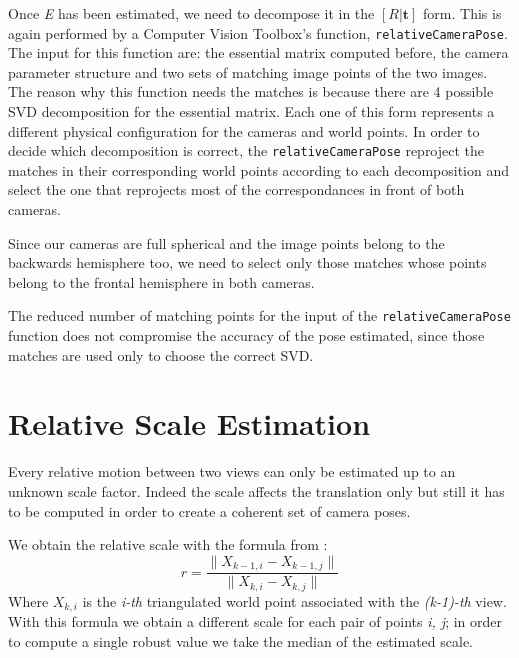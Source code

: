 Once \textit{E} has been estimated, we need to decompose it in the 
\( [R|\mathbf{t} ] \) form. This is again performed by a Computer Vision 
Toolbox's function, {\tt relativeCameraPose}.
The input for this function are: the essential matrix computed before, the 
camera parameter structure and two sets of matching image points of the two 
images.
The reason why this function needs the matches is because there are 4 possible 
SVD decomposition for the essential matrix. Each one of this form represents a 
different physical configuration for the cameras and world points.
In order to decide which decomposition is correct, the {\tt relativeCameraPose}
reproject the matches in their corresponding world points according to each 
decomposition and select the one that reprojects most of the correspondances in 
front of both cameras.

Since our cameras are full spherical and the image points belong to the 
backwards hemisphere too, we need to select only those matches whose points 
belong to the frontal hemisphere in both cameras.

The reduced number of matching points for the input of the 
{\tt relativeCameraPose} function does not compromise the accuracy of the pose 
estimated, since those matches are used only to choose the 
correct SVD.

\section{Relative Scale Estimation}
Every relative motion between two views can only be estimated up to an unknown 
scale factor. Indeed the scale affects the translation only but still it has to 
be computed in order to create a coherent set of camera poses.

We obtain the relative scale with the formula from 
\cite{scaramuzzaVisualOdometryI}:
\begin{equation}
	r = \frac{\| X_{k-1, i} - X_{k - 1, j} \|}{\| X_{k, i} - X_{k, j} \|}
\end{equation}
Where \( X_{k, i} \) is the \textit{i-th} triangulated world point associated 
with the \textit{(k-1)-th} view. With this formula we obtain a different scale 
for each pair of points \textit{i, j}; in order to compute a single robust value
we take the median of the estimated scale.

